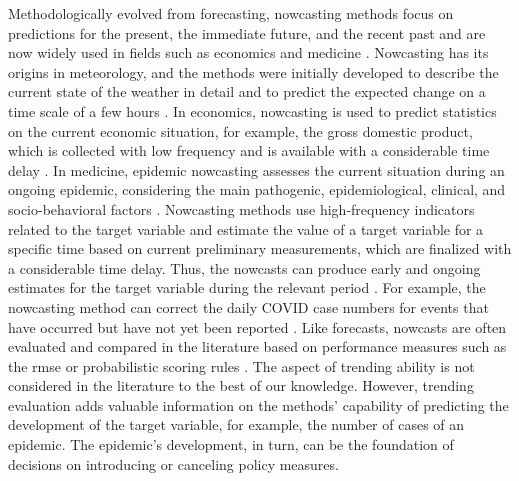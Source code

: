 Methodologically evolved from forecasting, nowcasting methods focus on predictions for the present, the immediate future, and the recent past \parencite{banbura2013now} and are now widely used in fields such as economics and medicine \parencite{bok2018macroeconomic, Wolffram2023}.
Nowcasting has its origins in meteorology, and the methods were initially developed to describe the current state of the weather in detail and to predict the expected change on a time scale of a few hours \parencite{browning1989nowcasting,schmid2019nowcasting}. 
In economics, nowcasting is used to predict statistics on the current economic situation, for example, the gross domestic product, which is collected with low frequency and is available with a considerable time delay \parencite{banbura2013now}.
In medicine, epidemic nowcasting assesses the current situation during an ongoing epidemic, considering the main pathogenic, epidemiological, clinical, and socio-behavioral factors \parencite{wu2021nowcasting}. 
Nowcasting methods use high-frequency indicators related to the target variable and estimate the value of a target variable for a specific time based on current preliminary measurements, which are finalized with a considerable time delay. 
Thus, the nowcasts can produce early and ongoing estimates for the target variable during the relevant period \parencite{castle2017forecasting}. 
For example, the nowcasting method can correct the daily COVID case numbers for events that have occurred but have not yet been reported \parencite{gunther2021nowcasting}. 
Like forecasts, nowcasts are often evaluated and compared in the literature based on performance measures such as the \ac{rmse} \parencite{gunther2021nowcasting} or probabilistic scoring rules \parencite{Wolffram2023}. 
The aspect of trending ability is not considered in the literature to the best of our knowledge. 
However, trending evaluation adds valuable information on the methods' capability of predicting the development of the target variable, for example, the number of cases of an epidemic.
The epidemic's development, in turn, can be the foundation of decisions on introducing or canceling policy measures. 


